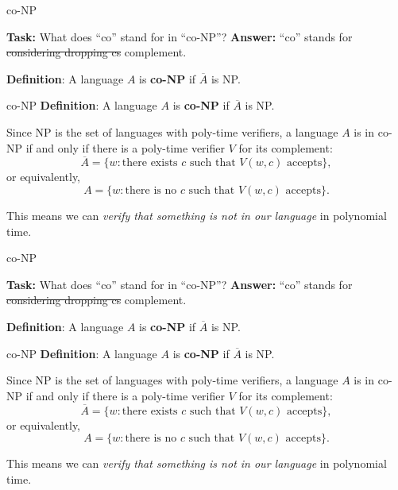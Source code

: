 \documentclass{beamer}
\begin{document}
\begin{frame}{co-NP}

\textbf{Task:} What does ``co'' stand for in ``co-NP''?
\pause
\textbf{Answer:} ``co'' stands for \sout{considering dropping cs} complement.
\vspace{2mm}

\textbf{Definition}: A language $A$ is \textbf{co-NP} if $\overline{A}$ is NP. 
\end{frame}

\begin{frame}{co-NP}
\textbf{Definition}: A language $A$ is \textbf{co-NP} if $\overline{A}$ is NP. 

\vspace{2mm}
Since NP is the set of languages with poly-time verifiers, a language $A$ is in co-NP if and only if there is a poly-time verifier $V$ for its complement:
$$\overline{A} = \{w: \text{there exists $c$ such that $V(w, c)$ accepts}\},$$
or equivalently,
$$A = \{w: \text{there is no $c$ such that $V(w, c)$ accepts}\}.$$

\vspace{2mm}

This means we can \textit{verify that something is not in our language} in polynomial time.
\end{frame}

\begin{frame}{co-NP}

\textbf{Task:} What does ``co'' stand for in ``co-NP''?
\pause
\textbf{Answer:} ``co'' stands for \sout{considering dropping cs} complement.
\vspace{2mm}

\textbf{Definition}: A language $A$ is \textbf{co-NP} if $\overline{A}$ is NP. 
\end{frame}

\begin{frame}{co-NP}
\textbf{Definition}: A language $A$ is \textbf{co-NP} if $\overline{A}$ is NP. 

\vspace{2mm}
Since NP is the set of languages with poly-time verifiers, a language $A$ is in co-NP if and only if there is a poly-time verifier $V$ for its complement:
$$\overline{A} = \{w: \text{there exists $c$ such that $V(w, c)$ accepts}\},$$
or equivalently,
$$A = \{w: \text{there is no $c$ such that $V(w, c)$ accepts}\}.$$

\vspace{2mm}

This means we can \textit{verify that something is not in our language} in polynomial time.
\end{frame}
\end{document}
